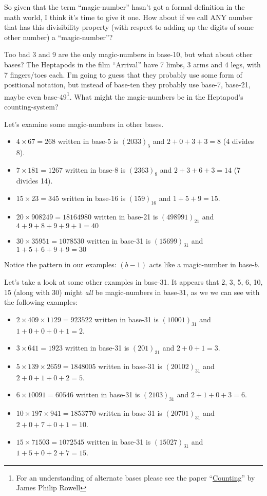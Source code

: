 \documentclass{article}
\begin{document}
So given that the term ``magic-number'' hasn't got
a formal definition in the math world, I think it's time to give it one.
How about if we call ANY number that has this
divisibility property (with respect to adding up the digits of some other number) a ``magic-number''?

Too bad 3 and 9 are the only magic-numbers in base-10,
but what about other bases?
The Heptapods in the film ``Arrival'' have 7 limbs, 3 arms and 4 legs, with 7 fingers/toes each.
I'm going to guess that they probably use some form of positional
notation, but instead of base-ten they probably use base-7, base-21,
maybe even base-49\footnote{For an understanding of alternate bases please see
the paper ``\href {https://www.dropbox.com/s/bwmrffmkcidnf27/basisReprThm.pdf?dl=0}
{Counting}'' by James Philip Rowell}. What might the magic-numbers be in the Heptapod's
counting-system?

Let's examine some magic-numbers
in other bases.
\begin{itemize}
\item $4\times{}67=268$ written in base-5 is $(2033)_5$ and $2+0+3+3=8$ (4 divides 8).
\item $7\times{}181=1267$ written in base-8 is $(2363)_8$ and $2+3+6+3=14$ (7 divides 14).
\item $15\times{}23=345$ written in base-16 is $(159)_{16}$ and $1+5+9=15$.
\item $20\times{}908249=18164980$ written in base-21 is $(498991)_{21}$ and $4+9+8+9+9+1=40$
\item $30\times{}35951=1078530$ written in base-31 is $(15699)_{31}$ and $1+5+6+9+9=30$
\end{itemize}

Notice the pattern in our examples:
$(b-1)$ acts like a magic-number in base-$b$.

Let's take a look at some other examples in base-31.
It appears that 2, 3, 5, 6, 10, 15 (along with 30)
might \emph{all} be magic-numbers in base-31, as we we can see
with the following examples:
\begin{itemize}
\item $2\times{}409\times{}1129=923522$ written in base-31 is $(10001)_{31}$ and $1+0+0+0+1=2$.
\item $3\times{}641=1923$ written in base-31 is $(201)_{31}$ and $2+0+1=3$.
\item $5\times{}139\times{}2659=1848005$ written in base-31 is $(20102)_{31}$ and $2+0+1+0+2=5$.
\item $6\times{}10091=60546$ written in base-31 is $(2103)_{31}$ and $2+1+0+3=6$.
\item $10\times{}197\times{}941=1853770$ written in base-31 is $(20701)_{31}$ and $2+0+7+0+1=10$.
\item $15\times{}71503=1072545$ written in base-31 is $(15027)_{31}$ and $1+5+0+2+7=15$.
\end{itemize}
\end{document}

